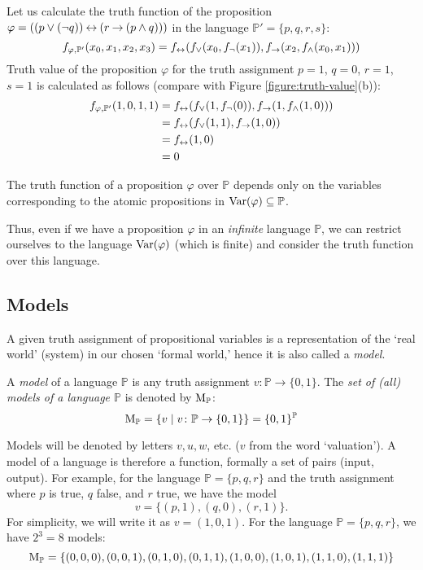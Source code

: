 \begin{example}
    Let us calculate the truth function of the proposition $\varphi = ((p \lor (\neg q)) \mathbin{\leftrightarrow} (r \mathbin{\rightarrow} (p \land q)))$ in the language $\mathbb P'=\{p,q,r,s\}$:
    $$        
    f_{\varphi,\mathbb P'}(x_0,x_1,x_2,x_3)=f_{\mathbin{\leftrightarrow}}(f_{\lor}(x_0,f_\neg(x_1)),f_{\mathbin{\rightarrow}}(x_2,f_{\land}(x_0,x_1)))    
    $$
    Truth value of the proposition $\varphi$ for the truth assignment $p=1$, $q=0$, $r=1$, $s=1$ is calculated as follows (compare with Figure \ref{figure:truth-value}(b)):
    \begin{align*}
    f_{\varphi,\mathbb P'}(1,0,1,1)
        &=f_{\mathbin{\leftrightarrow}}(f_{\lor}(1,f_\neg(0)),f_{\mathbin{\rightarrow}}(1,f_{\land}(1,0))) \\
        &=f_{\mathbin{\leftrightarrow}}(f_{\lor}(1,1),f_{\mathbin{\rightarrow}}(1,0))\\
        &=f_{\mathbin{\leftrightarrow}}(1,0)\\
        &=0
    \end{align*}
\end{example}

\begin{observation}
The truth function of a proposition $\varphi$ over $\mathbb P$ depends only on the variables corresponding to the atomic propositions in $\operatorname{Var}(\varphi)\subseteq\mathbb P$.
\end{observation}

Thus, even if we have a proposition $\varphi$ in an \emph{infinite} language $\mathbb P$, we can restrict ourselves to the language $\operatorname{Var}(\varphi)$ (which is finite) and consider the truth function over this language. 

\subsection{Models}

A given truth assignment of propositional variables is a representation of the `real world' (system) in our chosen `formal world,' hence it is also called a \emph{model}.

\begin{definition}\label{definition:model}
    A \emph{model} of a language $\mathbb P$ is any truth assignment $v\colon \mathbb P\to \{0,1\}$. The \emph{set of (all) models of a language $\mathbb P$} is denoted by $\operatorname{M}_\mathbb P$:
    $$
    \operatorname{M}_\mathbb P=\left\{v \mid v\colon \mathbb P\to \{0,1\}\right\}=\{0,1\}^\mathbb P
    $$
\end{definition}
Models will be denoted by letters $v,u,w$, etc. ($v$ from the word `valuation'). A model of a language is therefore a function, formally a set of pairs (input, output). For example, for the language $\mathbb P=\{p,q,r\}$ and the truth assignment where $p$ is true, $q$ false, and $r$ true, we have the model
$$
v = \{(p,1),(q,0),(r,1)\}.
$$
For simplicity, we will write it as $v = (1,0,1)$. For the language $\mathbb P = \{p,q,r\}$, we have $2^3 = 8$ models: 
$$
\operatorname{M}_\mathbb P = \{(0,0,0),(0,0,1),(0,1,0),(0,1,1),(1,0,0),(1,0,1),(1,1,0),(1,1,1)\}
$$

